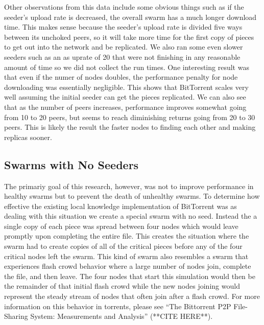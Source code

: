 Other observations from this data include some obvious things such as
if the seeder's upload rate is decreased, the overall swarm has a much
longer download time. This makes sense because the seeder's upload rate
is divided five ways between its unchoked peers, so it will take more
time for the first copy of pieces to get out into the network and be
replicated. We also ran some even slower seeders such as an as uprate
of 20 that were not finishing in any reasonable amount of time so we
did not collect the run times. One interesting result was that even if
the numer of nodes doubles, the performance penalty for node downloading
was essentially negligible. This shows that BitTorrent scales very well
assuming the initial seeder can get the pieces replicated.  We can also
see that as the number of peers increases, performance improves somewhat
going from 10 to 20 peers, but seems to reach diminishing returns going
from 20 to 30 peers. This is likely the result the faster nodes to
finding each other and making replicas sooner.



\subsection{Swarms with No Seeders}

The primariy goal of this research, however, was not to improve
performance in healthy swarms but to prevent the death of unhealthy
swarms. To determine how effective the existing local knowledge
implementation of BitTorrent was as dealing with this situation we
create a special swarm with no seed. Instead the a single copy of
each piece was spread between four nodes which would leave promptly
upon completing the entire file. This creates the situation where the
swarm had to create copies of all of the critical pieces before any of
the four critical nodes left the swarm. This kind of swarm also
resembles a swarm that experiences flash crowd behavior where a
large number of nodes join, complete the file, and then leave. The
four nodes that start this simulation would then be the remainder of
that initial flash crowd while the new nodes joining would represent
the steady stream of nodes that often join after a flash crowd. For
more information on this behavior in torrents, please see 
``The Bittorrent  P2P File-Sharing System: Measurements and Analysis''
(**CITE HERE**). 

